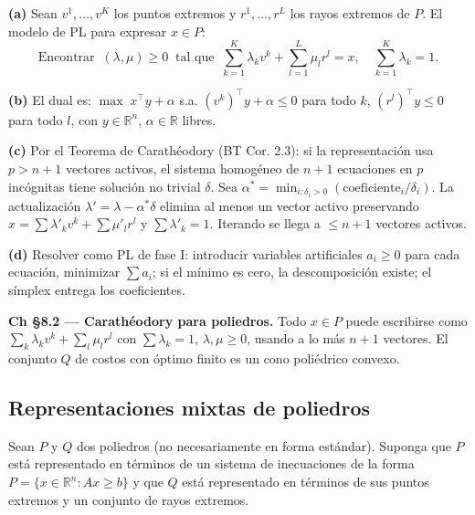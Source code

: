\documentclass[12pt]{article}
\theoremstyle{plain}
\begin{document}
\begin{solucion}

\noindent\textbf{(a)} Sean $v^1,\ldots,v^K$ los puntos extremos y $r^1,\ldots,r^L$ los rayos extremos de $P$. El modelo de PL para expresar $x \in P$:
\[
\text{Encontrar}\;\;(\lambda,\mu) \geq 0 \;\;\text{tal que}\;\; \sum_{k=1}^K \lambda_k v^k + \sum_{l=1}^L \mu_l r^l = x, \quad \sum_{k=1}^K \lambda_k = 1.
\]

\noindent\textbf{(b)} El dual es: $\max\; x^\top y + \alpha$ s.a. $(v^k)^\top y + \alpha \leq 0$ para todo $k$, $(r^l)^\top y \leq 0$ para todo $l$, con $y \in \mathbb{R}^n$, $\alpha \in \mathbb{R}$ libres.

\noindent\textbf{(c)} Por el Teorema de Carathéodory (BT Cor. 2.3): si la representación usa $p > n+1$ vectores activos, el sistema homogéneo de $n+1$ ecuaciones en $p$ incógnitas tiene solución no trivial $\delta$. Sea $\alpha^* = \min_{i:\delta_i > 0}(\text{coeficiente}_i/\delta_i)$. La actualización $\lambda' = \lambda - \alpha^*\delta$ elimina al menos un vector activo preservando $x = \sum \lambda'_k v^k + \sum \mu'_l r^l$ y $\sum \lambda'_k = 1$. Iterando se llega a $\leq n+1$ vectores activos.

\noindent\textbf{(d)} Resolver como PL de fase I: introducir variables artificiales $a_i \geq 0$ para cada ecuación, minimizar $\sum a_i$; si el mínimo es cero, la descomposición existe; el símplex entrega los coeficientes.

\end{solucion}

\begin{teofund}
\textbf{Ch §8.2 — Carathéodory para poliedros.} Todo $x\in P$ puede escribirse como $\sum_k\lambda_k v^k+\sum_l\mu_l r^l$ con $\sum\lambda_k=1$, $\lambda,\mu\geq 0$, usando a lo más $n+1$ vectores. El conjunto $Q$ de costos con óptimo finito es un cono poliédrico convexo.
\end{teofund}

\bigskip

\subsection{Representaciones mixtas de poliedros}

Sean $P$ y $Q$ dos poliedros (no necesariamente en forma estándar). Suponga que $P$ está
representado en términos de un sistema de inecuaciones de la forma
$P = \{x \in \mathbb{R}^n : Ax \geq b\}$
y que $Q$ está representado en términos de sus puntos extremos y un conjunto de rayos
extremos.
\end{document}
